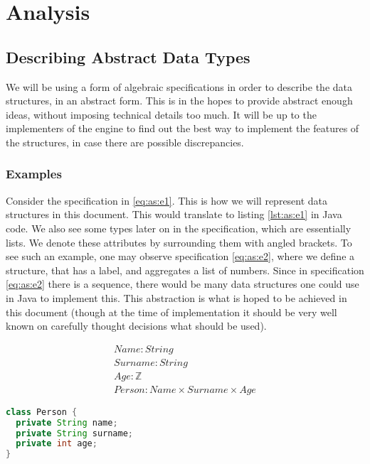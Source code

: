 \section{Analysis}

\subsection{Describing Abstract Data Types}

We will be using a form of algebraic specifications in order to describe the
data structures, in an abstract form. This is in the hopes to provide abstract
enough ideas, without imposing technical details too much. It will be up to the
implementers of the engine to find out the best way to implement the features
of the structures, in case there are possible discrepancies.

\subsubsection{Examples}

Consider the specification in \ref{eq:as:e1}. This is how we will represent
data structures in this document. This would translate to listing \ref{lst:as:e1}
in Java code. We also see some types later on in the specification, which are
essentially lists. We denote these attributes by surrounding them with angled
brackets. To see such an example, one may observe specification \ref{eq:as:e2},
where we define a structure, that has a label, and aggregates a list of numbers.
Since in specification \ref{eq:as:e2} there is a sequence, there would be many
data structures one could use in Java to implement this. This abstraction is
what is hoped to be achieved in this document (though at the time of
implementation it should be very well known on carefully thought decisions
what should be used).

\begin{equation}
\label{eq:as:e1}
\begin{split}
Name\colon String \\
Surname\colon String \\
Age\colon \mathbb{Z} \\
Person\colon Name \times Surname \times Age
\end{split}
\end{equation}

\begin{lstlisting}[caption=Representing the algebraic specification in Java
                  ,language=Java,label=lst:as:e1]
class Person {
  private String name;
  private String surname;
  private int age;
}
\end{lstlisting}

